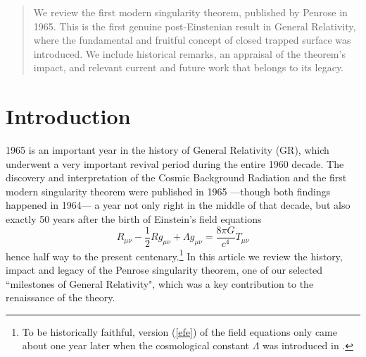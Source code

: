 \documentclass[12pt]{iopart}
\def\be{\begin{equation}}
\def\ee{\end{equation}}
\begin{document}

\author{Jos\'e M M Senovilla}


\address{F\'{\i}sica Te\'orica, Universidad del Pa\'{\i}s Vasco, Apartado 644, 48080 Bilbao, Spain}

\author{David Garfinkle}
\address{Dept. of Physics, Oakland University,
Rochester, MI 48309, USA}
\address{and Michigan Center for Theoretical Physics, Randall Laboratory of Physics, University of Michigan, Ann Arbor, MI 48109-1120, USA}

\begin{abstract}
We review the first modern singularity theorem, published by Penrose in 1965. This is the first genuine post-Einstenian result in General Relativity, where the fundamental and fruitful concept of closed trapped surface was introduced. We include historical remarks, an appraisal of the theorem's impact, and relevant current and future work that belongs to its legacy.
\end{abstract}


\section{Introduction}\label{sec:intro}
1965 is an important year in the history of General Relativity (GR), which underwent a very important revival period during the entire 1960 decade. The discovery and interpretation of the Cosmic Background Radiation \cite{PW,DPRW} and the first modern singularity theorem  \cite{P} were published in 1965 ---though both findings happened in 1964--- a year not only right in the middle of that decade, but also exactly 50 years after the birth of Einstein's field equations
\be
R_{\mu\nu} -\frac{1}{2} R g_{\mu\nu} +\Lambda g_{\mu\nu} =\frac{8\pi G}{c^4} T_{\mu\nu} \label{efe}
\ee
hence half way to the present centenary.\footnote{To be historically faithful, version (\ref{efe}) of the field equations only came about one year later when the cosmological constant $\Lambda$ was introduced in \cite{E0}.} In this article we review the history, impact and legacy of the Penrose singularity theorem, one of our selected ``milestones of General Relativity", which was a key contribution to the renaissance of the theory.
\end{document}
